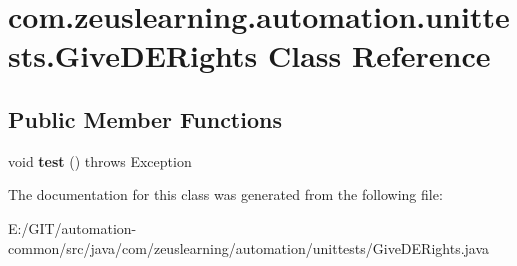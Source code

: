 \hypertarget{classcom_1_1zeuslearning_1_1automation_1_1unittests_1_1GiveDERights}{}\section{com.\+zeuslearning.\+automation.\+unittests.\+Give\+D\+E\+Rights Class Reference}
\label{classcom_1_1zeuslearning_1_1automation_1_1unittests_1_1GiveDERights}
\subsection*{Public Member Functions}
\begin{DoxyCompactItemize}
\item 
\hypertarget{classcom_1_1zeuslearning_1_1automation_1_1unittests_1_1GiveDERights_a0fa725443116affc3fe451388523f950}{}\label{classcom_1_1zeuslearning_1_1automation_1_1unittests_1_1GiveDERights_a0fa725443116affc3fe451388523f950} 
void {\bfseries test} ()  throws Exception 
\end{DoxyCompactItemize}


The documentation for this class was generated from the following file\+:\begin{DoxyCompactItemize}
\item 
E\+:/\+G\+I\+T/automation-\/common/src/java/com/zeuslearning/automation/unittests/Give\+D\+E\+Rights.\+java\end{DoxyCompactItemize}
